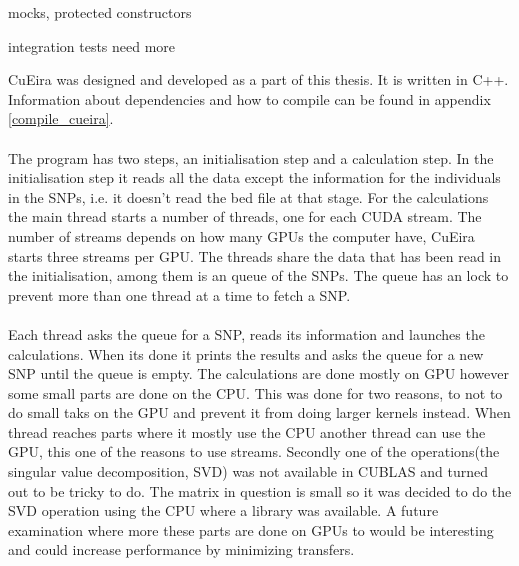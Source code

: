 \documentclass[10pt,a4paper]{report}
\begin{document}
mocks, protected constructors

integration tests
need more




CuEira was designed and developed as a part of this thesis. It is written in C++. Information about dependencies and how to compile can be found in appendix \ref{compile_cueira}.\\
\\
The program has two steps, an initialisation step and a calculation step. In the initialisation step it reads all the data except the information for the individuals in the SNPs, i.e. it doesn't read the bed file at that stage. For the calculations the main thread starts a number of threads, one for each CUDA stream. The number of streams depends on how many GPUs the computer have, CuEira starts three streams per GPU. The threads share the data that has been read in the initialisation, among them is an queue of the SNPs. The queue has an lock to prevent more than one thread at a time to fetch a SNP.\\
\\
Each thread asks the queue for a SNP, reads its information and launches the calculations. When its done it prints the results and asks the queue for a new SNP until the queue is empty. The calculations are done mostly on GPU however some small parts are done on the CPU. This was done for two reasons, to not to do small taks on the GPU and prevent it from doing larger kernels instead. When thread reaches parts where it mostly use the CPU another thread can use the GPU, this one of the reasons to use streams. Secondly one of the operations(the singular value decomposition, SVD) was not available in CUBLAS and turned out to be tricky to do. The matrix in question is small so it was decided to do the SVD operation using the CPU where a library was available. A future examination where more these parts are done on GPUs to would be interesting and could increase performance by minimizing transfers.



\end{document}
